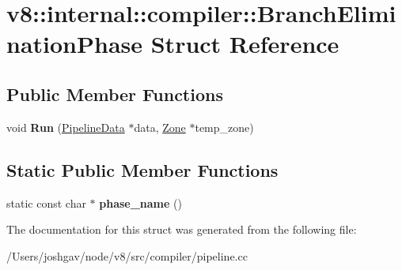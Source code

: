 \hypertarget{structv8_1_1internal_1_1compiler_1_1_branch_elimination_phase}{}\section{v8\+:\+:internal\+:\+:compiler\+:\+:Branch\+Elimination\+Phase Struct Reference}
\label{structv8_1_1internal_1_1compiler_1_1_branch_elimination_phase}
\subsection*{Public Member Functions}
\begin{DoxyCompactItemize}
\item 
void {\bfseries Run} (\hyperlink{classv8_1_1internal_1_1compiler_1_1_pipeline_data}{Pipeline\+Data} $\ast$data, \hyperlink{classv8_1_1internal_1_1_zone}{Zone} $\ast$temp\+\_\+zone)\hypertarget{structv8_1_1internal_1_1compiler_1_1_branch_elimination_phase_a4e3e30f3de59301fc1aab2a649dd9601}{}\label{structv8_1_1internal_1_1compiler_1_1_branch_elimination_phase_a4e3e30f3de59301fc1aab2a649dd9601}

\end{DoxyCompactItemize}
\subsection*{Static Public Member Functions}
\begin{DoxyCompactItemize}
\item 
static const char $\ast$ {\bfseries phase\+\_\+name} ()\hypertarget{structv8_1_1internal_1_1compiler_1_1_branch_elimination_phase_a0f9a42100020702febe6236c0e698fb3}{}\label{structv8_1_1internal_1_1compiler_1_1_branch_elimination_phase_a0f9a42100020702febe6236c0e698fb3}

\end{DoxyCompactItemize}


The documentation for this struct was generated from the following file\+:\begin{DoxyCompactItemize}
\item 
/\+Users/joshgav/node/v8/src/compiler/pipeline.\+cc\end{DoxyCompactItemize}
